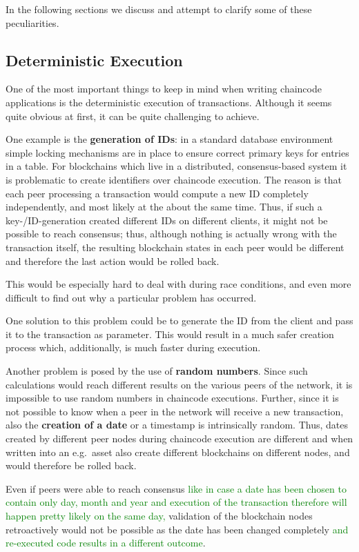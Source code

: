 In the following sections we discuss and attempt to clarify some of these peculiarities.

\subsection{Deterministic Execution}

One of the most important things to keep in mind when writing chaincode applications is the deterministic execution of transactions. Although it seems quite obvious at first, it can be quite challenging to achieve.

One example is the \textbf{generation of IDs}:  in a standard database environment simple locking mechanisms are in place to ensure correct primary keys for entries in a table. For blockchains which live in a distributed, consensus-based system it is problematic to create identifiers over chaincode execution. The reason is that each peer processing a transaction would compute a new ID completely independently, and most likely at the about the same time. Thus, if such a key-/ID-generation created different IDs on different clients, it might not be possible to reach consensus; thus, although nothing is actually wrong with the transaction itself, the resulting blockchain states in each peer would be different and therefore the last action would be rolled back.

This would be especially hard to deal with during race conditions, and even more difficult to find out why a particular problem has occurred.

One solution to this problem could be to generate the ID from the client and pass it to the transaction as parameter. This would result in a much safer creation process which, additionally, is much faster during execution.

Another problem is posed by the use of \textbf{random numbers}. Since such calculations would reach different results on the various peers of the network, it is impossible to use random numbers in chaincode executions. Further, since it is not possible to know when a peer in the network will receive a new transaction, also the \textbf{creation of a date} or a timestamp is intrinsically random. Thus, dates created by different peer nodes during chaincode execution are different and when written into an e.g.\ asset also create different blockchains on different nodes, and would therefore be rolled back.

Even if peers were able to reach consensus \textcolor{green}{like in case a date has been chosen to contain only day, month and year and execution of the transaction therefore will happen pretty likely on the same day,} validation of the blockchain nodes retroactively would not be possible as the date has been changed completely \textcolor{green}{and re-executed code results in a different outcome}.

